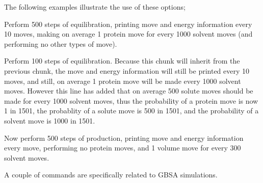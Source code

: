 \documentclass[letterpaper,10pt,english]{sphinxmanual}
\begin{document}
The following examples illustrate the use of these options;

%
\begin{sphinxVerbatim}[commandchars=\\\{\}]
      
\end{sphinxVerbatim}

Perform 500 steps of equilibration, printing move and energy information every 10 moves, making on average 1 protein move for every 1000 solvent moves (and performing no other types of move).

%
\begin{sphinxVerbatim}[commandchars=\\\{\}]
   
\end{sphinxVerbatim}

Perform 100 steps of equilibration. Because this chunk will inherit from the previous chunk, the move and energy information will still be printed every 10 moves, and still, on average 1 protein move will be made every 1000 solvent moves. However this line has added that on average 500 solute moves should be made for every 1000 solvent moves, thus the probability of a protein move is now 1 in 1501, the probablity of a solute move is 500 in 1501, and the probability of a solvent move is 1000 in 1501.

%
\begin{sphinxVerbatim}[commandchars=\\\{\}]
      
\end{sphinxVerbatim}

Now perform 500 steps of production, printing move and energy information every move, performing no protein moves, and 1 volume move for every 300 solvent moves.

A couple of  commands are specifically related to GBSA simulations.

\ignorespaces 
\def\sphinxLiteralBlockLabel{\label{\detokenize{protoms:index-71}}}
%
\begin{sphinxVerbatim}[commandchars=\\\{\}]
     
\end{sphinxVerbatim}
\end{document}
